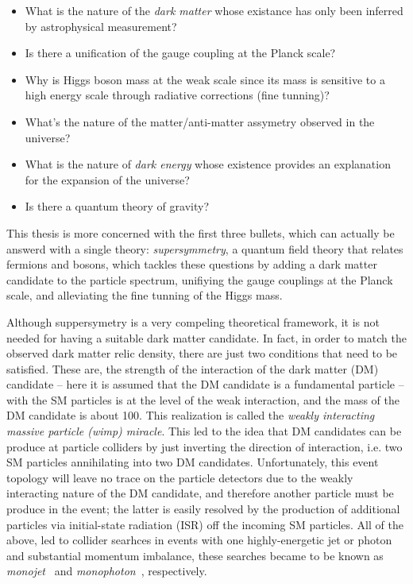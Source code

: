 \begin{itemize}
\item What is the nature of the \textit{dark matter} whose existance
  has only been inferred by astrophysical measurement?
\item Is there a unification of the gauge coupling at the Planck scale?
\item Why is Higgs boson mass at the weak scale since its mass is
  sensitive to a high energy scale through radiative corrections (fine
  tunning)?
\item What's the nature of the matter/anti-matter assymetry observed
  in the universe?
\item  What is the nature of \textit{dark energy} whose existence provides an
  explanation for the expansion of the universe?
\item Is there a quantum theory of gravity?
\end{itemize} 

This thesis is more concerned with the first three bullets, which can
actually be answerd with a single theory: \textit{supersymmetry}, a
quantum field theory that relates fermions and bosons\cite{xx}, which tackles
these questions by adding a dark matter candidate to the
particle spectrum, unifiying the gauge couplings at the Planck scale,
and alleviating the fine tunning of the Higgs mass.

Although suppersymetry is a very compeling theoretical framework, it is not needed for having
a suitable dark matter candidate. In fact, in order to match
the observed dark matter relic density, there are just two
conditions that need to be satisfied. These are, the strength of the interaction of the dark matter (DM)
candidate -- here it is assumed that the DM candidate is a fundamental
particle -- with the SM particles is at the level of the weak interaction,
and the mass of the DM candidate is about 100\GeV. This realization is
called the \textit{weakly interacting massive particle (wimp)
  miracle}. This led to the idea that DM candidates can be
produce at particle colliders by just inverting the direction of
interaction, i.e. two SM particles annihilating into two DM
candidates. Unfortunately, this event topology will leave no trace on the particle
detectors due to the weakly interacting nature of the DM candidate,
and therefore another particle must be produce in the event; the latter is
easily resolved by the production of additional particles via
initial-state radiation (ISR) off the incoming SM
particles. All of the above, led to collider searhces in events with one highly-energetic jet
or photon and substantial momentum imbalance, these searches became to
be known as \textit{monojet}~\cite{Aad:2011xw,Chatrchyan:2012me} and
\textit{monophoton}~\cite{Khachatryan:2014rwa,Aad:2014tda},
respectively.

